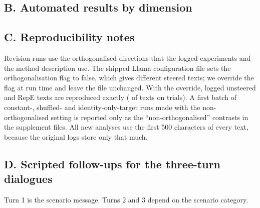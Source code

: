 \documentclass[letterpaper]{article} %
\begin{document}
\begin{table}[h]
\centering
\caption{Identity pairs (agent, user) with dictionary EPA (2010 US survey). Six pairs come in role-reversed twins; friend/friend is symmetric.}
\label{tab:design_pairs}
\small

\end{table}

\subsection*{B. Automated results by dimension}

\begin{table}[h]
\centering
\caption{Mean distance to ACT targets per dimension (1,300 trials per model), original reader (full text) and independent reader (first 500 characters).}
\label{tab:steering_dims}
\small

\end{table}

\subsection*{C. Reproducibility notes}

Revision runs use the orthogonalised directions that the logged experiments and the method description use. The shipped Llama configuration file sets the orthogonalisation flag to false, which gives different steered texts; we override the flag at run time and leave the file unchanged. With the override, logged unsteered and RepE texts are reproduced exactly (\ReproIdentical{} of \ReproTotal{} texts on \ReproTrials{} trials). A first batch of constant-, shuffled- and identity-only-target runs made with the non-orthogonalised setting is reported only as the ``non-orthogonalised'' contrasts in the supplement files. All new analyses use the first 500 characters of every text, because the original logs store only that much.

\subsection*{D. Scripted follow-ups for the three-turn dialogues}

Turn 1 is the scenario message. Turns 2 and 3 depend on the scenario category.
\end{document}
